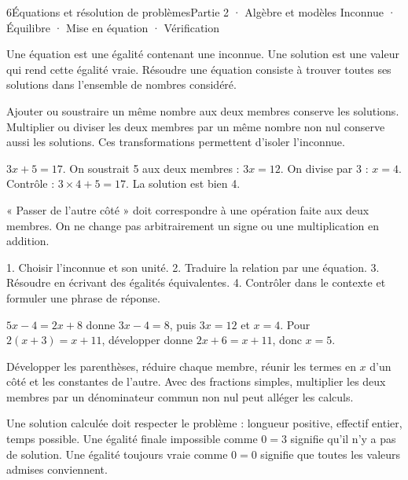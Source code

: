 \begin{ouverture}[calcul]{6}{Équations et résolution de problèmes}{Partie 2 · Algèbre et modèles}
{Inconnue · Équilibre · Mise en équation · Vérification}
\end{ouverture}
\pagestyle{otMain}\essentiel\fontsize{11}{15}\selectfont
{}\label{cours-6-1}
\begin{definition}Une équation est une égalité contenant une inconnue. Une solution est une valeur qui rend cette égalité vraie. Résoudre une équation consiste à trouver toutes ses solutions dans l’ensemble de nombres considéré.\end{definition}
\begin{propriete}Ajouter ou soustraire un même nombre aux deux membres conserve les solutions. Multiplier ou diviser les deux membres par un même nombre non nul conserve aussi les solutions. Ces transformations permettent d’isoler l’inconnue.\end{propriete}
\begin{exemple}$3x+5=17$. On soustrait 5 aux deux membres : $3x=12$. On divise par 3 : $x=4$. Contrôle : $3\times4+5=17$. La solution est bien 4.\end{exemple}
\label{fig-cours-6-1-cours-equilibre}

\begin{attention}« Passer de l’autre côté » doit correspondre à une opération faite aux deux membres. On ne change pas arbitrairement un signe ou une multiplication en addition.\end{attention}
\clearpage
{}\label{cours-6-2}
\begin{savoirfaire}1. Choisir l’inconnue et son unité. 2. Traduire la relation par une équation. 3. Résoudre en écrivant des égalités équivalentes. 4. Contrôler dans le contexte et formuler une phrase de réponse.\end{savoirfaire}
\begin{exemple}$5x-4=2x+8$ donne $3x-4=8$, puis $3x=12$ et $x=4$. Pour $2(x+3)=x+11$, développer donne $2x+6=x+11$, donc $x=5$.\end{exemple}
\begin{savoirfaire}Développer les parenthèses, réduire chaque membre, réunir les termes en $x$ d’un côté et les constantes de l’autre. Avec des fractions simples, multiplier les deux membres par un dénominateur commun non nul peut alléger les calculs.\end{savoirfaire}
\begin{attention}Une solution calculée doit respecter le problème : longueur positive, effectif entier, temps possible. Une égalité finale impossible comme $0=3$ signifie qu’il n’y a pas de solution. Une égalité toujours vraie comme $0=0$ signifie que toutes les valeurs admises conviennent.\end{attention}

